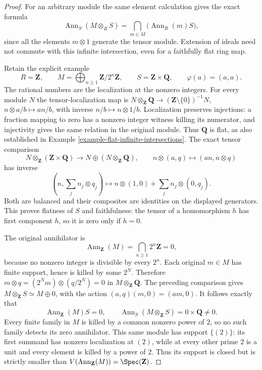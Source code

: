 \begin{proof}
\medskip\noindent
For an arbitrary module the same element calculation gives
the exact formula
$$
\operatorname{Ann}_S(M\otimes_RS)
=\bigcap_{m\in M}\bigl(\operatorname{Ann}_R(m)S\bigr),
$$
since all the elements $m\otimes1$ generate the tensor module.
Extension of ideals need not commute with this infinite
intersection, even for a faithfully flat ring map.

Retain the explicit example
$$
R=\mathbf Z,\qquad
M=\bigoplus_{n\geq1}\mathbf Z/2^n\mathbf Z,\qquad
S=\mathbf Z\times\mathbf Q,
\qquad \varphi(a)=(a,a).
$$
The rational numbers are the localization at the nonzero
integers. For every module $N$ the tensor-localization map is
$N\otimes_{\mathbf Z}\mathbf Q\to
(\mathbf Z\setminus\{0\})^{-1}N$,
$n\otimes a/b\mapsto an/b$, with inverse $n/b\mapsto n\otimes1/b$.
Localization preserves injections: a fraction mapping to zero
has a nonzero integer witness killing its numerator, and
injectivity gives the same relation in the original module.
Thus $\mathbf Q$ is flat, as also established in
Example \ref{example-flat-infinite-intersections}.
The exact tensor comparison
$$
N\otimes_{\mathbf Z}(\mathbf Z\times\mathbf Q)
\longrightarrow N\oplus(N\otimes_{\mathbf Z}\mathbf Q),
\qquad n\otimes(a,q)\longmapsto(an,n\otimes q)
$$
has inverse
$$
\left(n,\sum_j n_j\otimes q_j\right)
\longmapsto n\otimes(1,0)+\sum_j n_j\otimes(0,q_j).
$$
Both are balanced and their composites are identities on
the displayed generators. This proves flatness of $S$ and
faithfulness: the tensor of a homomorphism $h$ has first
component $h$, so it is zero only if $h=0$.

The original annihilator is
$$
\operatorname{Ann}_{\mathbf Z}(M)
=\bigcap_{n\geq1}2^n\mathbf Z=0,
$$
because no nonzero integer is divisible by every $2^n$.
Each original $m\in M$ has finite support, hence is killed
by some $2^N$. Therefore
$m\otimes q=(2^Nm)\otimes(q/2^N)=0$ in
$M\otimes_{\mathbf Z}\mathbf Q$. The preceding comparison gives
$M\otimes_{\mathbf Z}S\simeq M\oplus0$, with the action
$(a,q)(m,0)=(am,0)$. It follows exactly that
$$
\operatorname{Ann}_{\mathbf Z}(M)S=0,
\qquad
\operatorname{Ann}_S(M\otimes_{\mathbf Z}S)=0\times\mathbf Q\ne0.
$$
Every finite family in $M$ is killed by a common nonzero
power of $2$, so no such family detects its zero annihilator.
This same module has support $\{(2)\}$: its first summand
has nonzero localization at $(2)$, while at every other
prime $2$ is a unit and every element is killed by a power
of $2$. Thus its support is closed but is strictly smaller
than $V(\operatorname{Ann}_{\mathbf Z}(M))=\Spec(\mathbf Z)$.


\end{proof}
